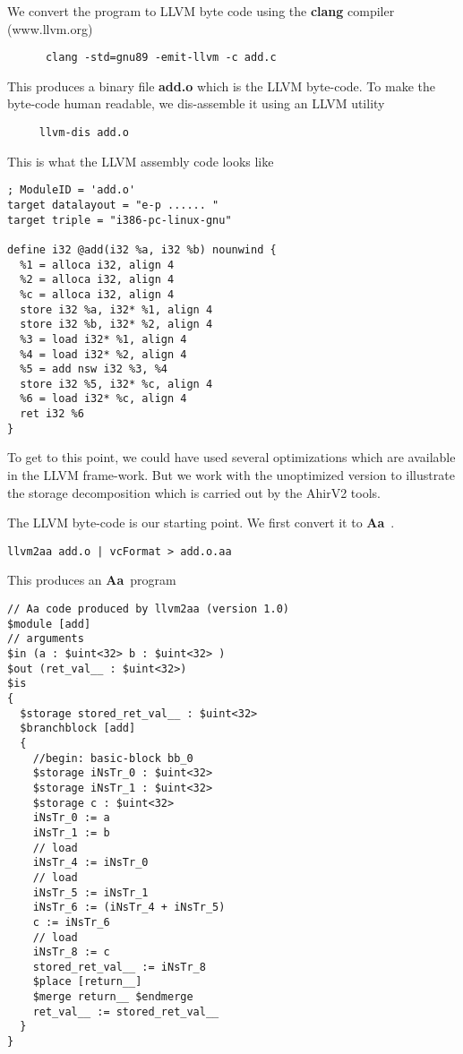 \documentclass{article}
\newcommand{\Aa}{{\bf Aa}~}
\begin{document}
We convert the program to LLVM byte code using
the {\bf clang} compiler (www.llvm.org)
\begin{verbatim}
      clang -std=gnu89 -emit-llvm -c add.c
\end{verbatim}
This produces a binary file {\bf add.o} which is
the LLVM byte-code.  To make the byte-code human
readable, we dis-assemble it using an LLVM utility
\begin{verbatim}
     llvm-dis add.o
\end{verbatim}
This is what the LLVM assembly code looks like
\begin{verbatim}
; ModuleID = 'add.o'
target datalayout = "e-p ...... "
target triple = "i386-pc-linux-gnu"

define i32 @add(i32 %a, i32 %b) nounwind {
  %1 = alloca i32, align 4
  %2 = alloca i32, align 4
  %c = alloca i32, align 4
  store i32 %a, i32* %1, align 4
  store i32 %b, i32* %2, align 4
  %3 = load i32* %1, align 4
  %4 = load i32* %2, align 4
  %5 = add nsw i32 %3, %4
  store i32 %5, i32* %c, align 4
  %6 = load i32* %c, align 4
  ret i32 %6
}
\end{verbatim}
To get to this point, we could have used several
optimizations which are available in the LLVM frame-work.
But we work with the unoptimized version to illustrate
the storage decomposition which is carried out by
the AhirV2 tools.

The LLVM byte-code is our starting point.  We first convert it
to \Aa.
\begin{verbatim}
llvm2aa add.o | vcFormat > add.o.aa
\end{verbatim}
This produces an \Aa program
\begin{verbatim}
// Aa code produced by llvm2aa (version 1.0)
$module [add]
// arguments
$in (a : $uint<32> b : $uint<32> )
$out (ret_val__ : $uint<32>)
$is
{
  $storage stored_ret_val__ : $uint<32>
  $branchblock [add]
  {
    //begin: basic-block bb_0
    $storage iNsTr_0 : $uint<32>
    $storage iNsTr_1 : $uint<32>
    $storage c : $uint<32>
    iNsTr_0 := a
    iNsTr_1 := b
    // load
    iNsTr_4 := iNsTr_0
    // load
    iNsTr_5 := iNsTr_1
    iNsTr_6 := (iNsTr_4 + iNsTr_5)
    c := iNsTr_6
    // load
    iNsTr_8 := c
    stored_ret_val__ := iNsTr_8
    $place [return__]
    $merge return__ $endmerge
    ret_val__ := stored_ret_val__
  }
}
\end{verbatim}
\end{document}
